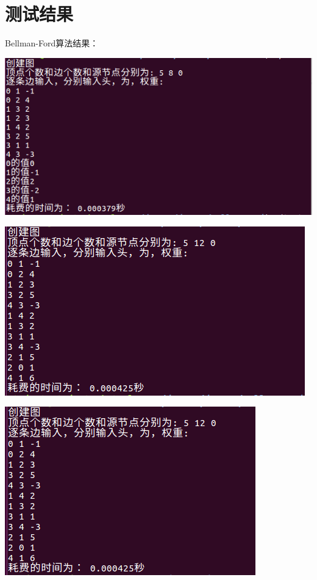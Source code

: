 \documentclass{ctexart}
\begin{document}
\section{测试结果}
Bellman-Ford算法结果：
\begin{center}
  \includegraphics[scale=0.6]{ss1.png}
  \hspace{0.1in}
\end{center}
\begin{center}
  \includegraphics[scale=0.5]{ss2.png}
  \hspace{0.1in}
\end{center}
\begin{center}
  \includegraphics[scale=0.6]{ss3.png}
  \hspace{0.1in}
\end{center}
\end{document}
